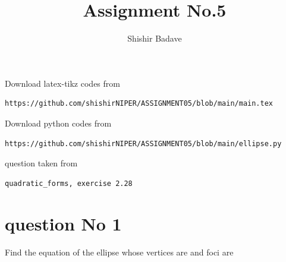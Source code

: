 \documentclass[journal,12pt,twocolumn]{IEEEtran}
\begin{document}
\makeatother
\let\StandardTheFigure\thefigure
\let\vec\mathbf
\renewcommand{\thefigure}{\theproblem}
\def\putbox#1#2#3{\makebox[0in][l]{\makebox[#1][l]{}\raisebox{\baselineskip}[0in][0in]{\raisebox{#2}[0in][0in]{#3}}}}
     \def\rightbox#1{\makebox[0in][r]{#1}}
     \def\centbox#1{\makebox[0in]{#1}}
     \def\topbox#1{\raisebox{-\baselineskip}[0in][0in]{#1}}
     \def\midbox#1{\raisebox{-0.5\baselineskip}[0in][0in]{#1}}
\vspace{3cm}
\title{Assignment No.5}
\author{Shishir Badave}
\maketitle
\newpage
\bigskip
\renewcommand{\thefigure}{\theenumi}
\renewcommand{\thetable}{\theenumi}
Download latex-tikz codes from
\begin{lstlisting}
https://github.com/shishirNIPER/ASSIGNMENT05/blob/main/main.tex
\end{lstlisting}
%
Download python codes from
\begin{lstlisting}
https://github.com/shishirNIPER/ASSIGNMENT05/blob/main/ellipse.py
\end{lstlisting}
%
question taken from
\begin{lstlisting}
quadratic_forms, exercise 2.28
\end{lstlisting}
\section{question No 1}
Find the equation of the ellipse whose vertices
are  and foci are 
\end{document}

